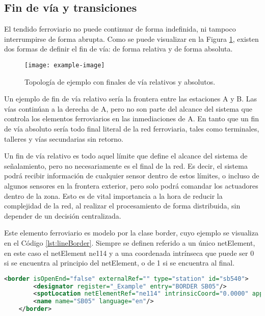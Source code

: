\subsection{Fin de vía y transiciones}
    \label{sec:bufferstop}

    El tendido ferroviario no puede continuar de forma indefinida, ni tampoco interrumpirse de forma abrupta. Como se puede visualizar en la Figura \ref{fig:frontera_1}, existen dos formas de definir el fin de vía: de forma relativa y de forma absoluta.

    \begin{figure}[!h]
        \centering
        \texttt{[image: example-image]}
        \centering\caption{Topología de ejemplo con finales de vía relativos y absolutos.}
        \label{fig:frontera_1}
    \end{figure}

    Un ejemplo de fin de vía relativo sería la frontera entre las estaciones A y B. Las vías continúan a la derecha de A, pero no son parte del alcance del sistema que controla los elementos ferroviarios en las inmediaciones de A. En tanto que un fin de vía absoluto sería todo final literal de la red ferroviaria, tales como terminales, talleres y vías secundarias sin retorno.
    
    Un fin de vía relativo es todo aquel límite que define el alcance del sistema de señalamiento, pero no necesariamente es el final de la red. Es decir, el sistema podrá recibir información de cualquier sensor dentro de estos límites, o incluso de algunos sensores en la frontera exterior, pero solo podrá comandar los actuadores dentro de la zona. Esto es de vital importancia a la hora de reducir la complejidad de la red, al realizar el procesamiento de forma distribuida, sin depender de un decisión centralizada.

    Este elemento ferroviario es modelo por la clase border, cuyo ejemplo se visualiza en el Código \ref{lst:lineBorder}. Siempre se definen referido a un único netElement, en este caso el netElement ne114 y a una coordenada intrínseca que puede ser 0 si se encuentra al principio del netElement, o de 1 si se encuentra al final.

    \begin{lstlisting}[language = XML, caption = Clase border , label = {lst:lineBorder}]
    <border isOpenEnd="false" externalRef="" type="station" id="sb540">
        <designator register="_Example" entry="BORDER SB05"/>
        <spotLocation netElementRef="ne114" intrinsicCoord="0.0000" applicationDirection="reverse" id="sb540_sloc01"/>
        <name name="SB05" language="en"/>
    </border>
    \end{lstlisting}

